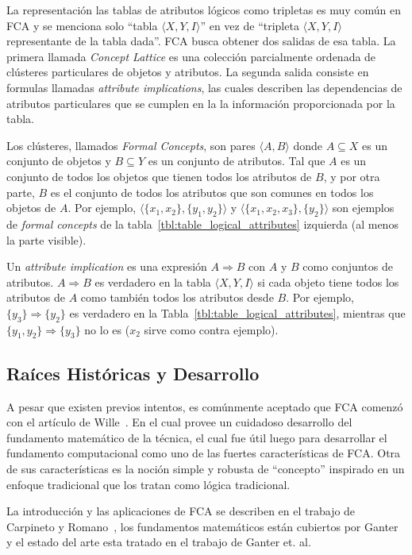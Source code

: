 \documentclass[12pt,oneside,letterpaper]{book}
\newcommand{\eng}[1]{\textit{#1}\xspace}			%
\newcommand{\abr}[1]{\textsc{#1}\xspace}           %
\theoremstyle{definition}
\begin{document}
La representación las tablas de atributos lógicos como tripletas es muy común en \abr{FCA} y se menciona solo ``tabla $\langle X,Y,I \rangle$'' en vez de ``tripleta $\langle X,Y,I \rangle$ representante de la tabla dada''. \abr{FCA} busca obtener dos salidas de esa tabla. La primera llamada \eng{Concept Lattice} es una colección parcialmente ordenada de clústeres particulares de objetos y atributos. La segunda salida consiste en formulas llamadas \eng{attribute implications}, las cuales describen las dependencias de atributos particulares que se cumplen en la la información proporcionada por la tabla.

Los clústeres, llamados \eng{Formal Concepts}, son pares $\langle A,B \rangle$ donde $A \subseteq X$ es un conjunto de objetos y $B \subseteq Y$ es un conjunto de atributos. Tal que $A$ es un conjunto de todos los objetos que tienen todos los atributos de $B$, y por otra parte, $B$ es el conjunto de todos los atributos que son comunes en todos los objetos de $A$. Por ejemplo, $\langle \{x_1, x_2\}, \{y_1, y_2\} \rangle$ y $\langle \{x_1, x_2, x_3\}, \{y_2\} \rangle$ son ejemplos de \eng{formal concepts} de la tabla~\ref{tbl:table_logical_attributes} izquierda (al menos la parte visible).

Un \eng{attribute implication} es una expresión $A \Rightarrow B$ con $A$ y $B$  como conjuntos de atributos. $A \Rightarrow B$ es verdadero en la tabla $\langle X,Y,I \rangle$ si cada objeto tiene todos los atributos de $A$ como también todos los atributos desde $B$. Por ejemplo, $\{y_3\} \Rightarrow \{y_2\}$ es verdadero en la Tabla~\ref{tbl:table_logical_attributes}, mientras que $\{y_1,y_2\} \Rightarrow \{y_3\}$ no lo es ($x_2$ sirve como contra ejemplo).

\subsection{Raíces Históricas y Desarrollo} %
\label{sub:ra_ces_historicas_y_desarrollo}
A pesar que existen previos intentos, es comúnmente aceptado que \abr{FCA} comenzó con el artículo de Wille~\cite{wille1982}. En el cual provee un cuidadoso desarrollo del fundamento matemático de la técnica, el cual fue útil luego para desarrollar el fundamento computacional como uno de las fuertes características de \abr{FCA}. Otra de sus características es la noción simple y robusta de ``concepto'' inspirado en un enfoque tradicional que los tratan como lógica tradicional. 

La introducción y las aplicaciones de \abr{FCA} se describen en el trabajo de Carpineto y Romano~\cite{carpineto2004}, los fundamentos matemáticos están cubiertos por Ganter~\cite{Ganter1997} y el estado del arte esta tratado en el trabajo de Ganter et. al.~\cite{Ganter2005}
\end{document}
